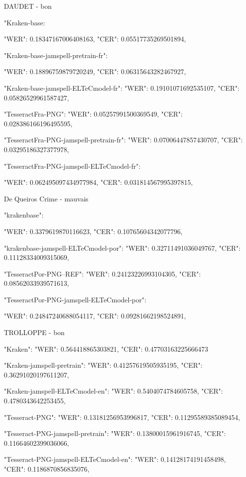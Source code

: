DAUDET - bon

 "Kraken-base: 

        "WER": 0.18347167006408163,
        "CER": 0.05517735269501894,
    

 "Kraken-base-jamspell-pretrain-fr": 

        "WER": 0.18896759879720249,
        "CER": 0.06315643282467927,
        
"Kraken-base-jamspell-ELTeCmodel-fr": 
        "WER": 0.19101071692535107,
        "CER": 0.05826529961587427,

  "TesseractFra-PNG": 
        "WER": 0.05257991500369549,
        "CER": 0.028386166196495595,

 "TesseractFra-PNG-jamspell-pretrain-fr": 
        "WER": 0.07006447857430707,
        "CER": 0.03295186327377978,


 "TesseractFra-PNG-jamspell-ELTeCmodel-fr": 
     
        "WER": 0.062495097434977984,
        "CER": 0.031814567995397815,


De Queiros Crime - mauvais

"krakenbase":
     
        "WER": 0.3379619870116623,
        "CER": 0.10765604342077796,



"krakenbase-jamspell-ELTeCmodel-por": 
        "WER": 0.32711491036049767,
        "CER": 0.11128334009315069,

  "TesseractPor-PNG--REF":
        "WER": 0.24123226993104305,
        "CER": 0.08562033939571613,

 "TesseractPor-PNG-jamspell-ELTeCmodel-por": 
    
        "WER": 0.24847240688054117,
        "CER": 0.09281662198524891,

TROLLOPPE - bon

    "Kraken": 
        "WER": 0.564418865303821,
        "CER": 0.47703163225666473

 "Kraken-jamspell-pretrain": 
        "WER": 0.41257619505935195,
        "CER": 0.36291020197611207,
        
 "Kraken-jamspell-ELTeCmodel-en": 
        "WER": 0.5404074784605758,
        "CER": 0.4780343642253455,

"Tesseract-PNG": 
        "WER": 0.13181256953996817,
        "CER": 0.11295589385089454,

 "Tesseract-PNG-jamspell-pretrain": 
        "WER": 0.13800015961916745,
        "CER": 0.11664602399036066,

 "Tesseract-PNG-jamspell-ELTeCmodel-en": 
        "WER": 0.14128174191458498,
        "CER": 0.1186870856835076,

      
   